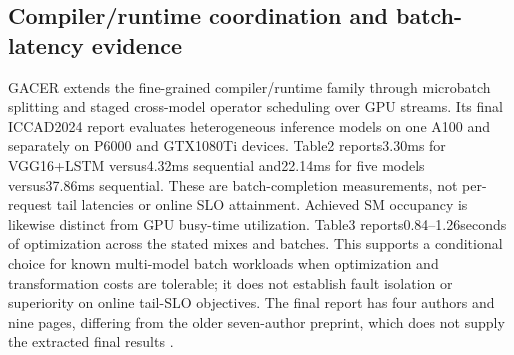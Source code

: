 \subsection{Compiler/runtime coordination and batch-latency evidence}
GACER extends the fine-grained compiler/runtime family through microbatch splitting and staged cross-model operator scheduling over GPU streams. Its final ICCAD2024 report evaluates heterogeneous inference models on one A100 and separately on P6000 and GTX1080Ti devices. Table2 reports3.30ms for VGG16+LSTM versus4.32ms sequential and22.14ms for five models versus37.86ms sequential. These are batch-completion measurements, not per-request tail latencies or online SLO attainment. Achieved SM occupancy is likewise distinct from GPU busy-time utilization. Table3 reports0.84--1.26seconds of optimization across the stated mixes and batches. This supports a conditional choice for known multi-model batch workloads when optimization and transformation costs are tolerable; it does not establish fault isolation or superiority on online tail-SLO objectives. The final report has four authors and nine pages, differing from the older seven-author preprint, which does not supply the extracted final results \cite{s027}.
